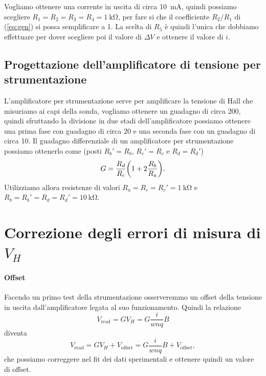 \documentclass[fleqn,varvw,preprintnumbers,citeautoscript]{memo}
\begin{document}
Vogliamo ottenere una corrente in uscita di circa \SI{10}{\milli\ampere}, quindi possiamo scegliere $R_1=R_2=R_3=R_4=\SI{1}{\kilo\ohm}$, per fare si che il coefficiente $R_2/R_1$ di (\ref{eq:gen}) si possa semplificare a 1. La scelta di $R_5$ è quindi l'unica che dobbiamo effettuare per dover scegliere poi il valore di $\Delta V$ e ottenere il valore di $i$.

\subsection{Progettazione dell'amplificatore di tensione per strumentazione}

L'amplificatore per strumentazione serve per amplificare la tensione di Hall che misuriamo ai capi della sonda, vogliamo ottenere un guadagno di circa 200, quindi sfruttando la divisione in due stadi dell'amplificatore possiamo ottenere una prima fase con guadagno di circa 20 e una seconda fase con un guadagno di circa 10. Il guadagno differenziale di un amplificatore per strumentazione possiamo ottenerlo come (posti $R_b'=R_b$, $R_c'=R_c$ e $R_d=R_d'$)\begin{equation}
    G= \frac{R_d}{R_c}\qty(1+2\frac{R_b}{R_a}).\label{eq:gain_diff}
\end{equation} Utilizziamo allora resistenze di valori $R_a=R_c=R_c'=\SI{1}{\kilo\ohm}$ e $R_b=R_b'=R_d=R_d'=\SI{10}{\kilo\ohm}$.

\section{Correzione degli errori di misura di $V_H$}

\paragraph{Offset} Facendo un primo test della strumentazione osserveremmo un offset della tensione in uscita dall'amplificatore legata al suo funzionamento. Quindi la relazione \begin{equation}
    V_\text{read} = GV_H = G\frac{i}{wnq}B
\end{equation} diventa \begin{equation}
    V_\text{read} = GV_H + V_\text{offset} = G\frac{i}{wnq}B + V_\text{offset}\label{eq:offset},
\end{equation} che possiamo correggere nel fit dei dati sperimentali e ottenere quindi un valore di offset. 
\end{document}
